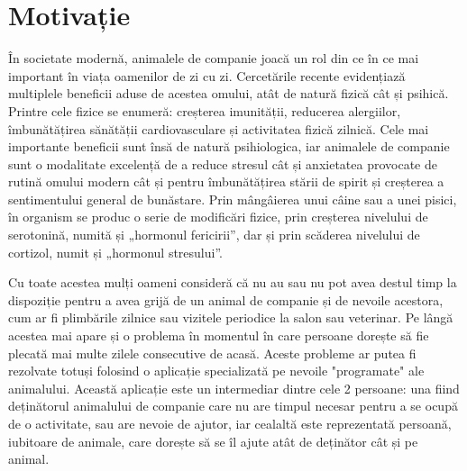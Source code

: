 \chapter*{Motivație} 

În societate modernă, animalele de companie joacă un rol din ce în ce mai important în viața oamenilor de zi cu zi. Cercetările recente evidențiază multiplele beneficii aduse de acestea omului, atât de natură fizică cât și psihică. Printre cele fizice se enumeră: creșterea imunității, reducerea alergiilor, îmbunătățirea sănătății cardiovasculare și activitatea fizică zilnică. Cele mai importante beneficii sunt însă de natură psihiologica, iar animalele de companie sunt o modalitate excelență de a reduce stresul cât și anxietatea provocate de rutină omului modern cât și pentru îmbunătățirea stării de spirit și creșterea a sentimentului general de bunăstare. Prin mângâierea unui câine sau a unei pisici, în organism se produc o serie de modificări fizice, prin creșterea nivelului de serotonină, numită și „hormonul fericirii”, dar și prin scăderea nivelului de cortizol, numit și „hormonul stresului”.

Cu toate acestea mulți oameni consideră că nu au sau nu pot avea destul timp la dispoziție pentru a avea grijă de un animal de companie și de nevoile acestora, cum ar fi plimbările zilnice sau vizitele periodice la salon sau veterinar. Pe lângă acestea mai apare și o problema în momentul în care persoane dorește să fie plecată mai multe zilele consecutive de acasă. Aceste probleme ar putea fi rezolvate totuși folosind o aplicație specializată pe nevoile "programate" ale animalului. Această aplicație este un intermediar dintre cele 2 persoane: una fiind deținătorul animalului de companie care nu are timpul necesar pentru a se ocupă de o activitate, sau are nevoie de ajutor, iar cealaltă este reprezentată persoană, iubitoare de animale, care dorește să se îl ajute atât de deținător cât și pe animal.

